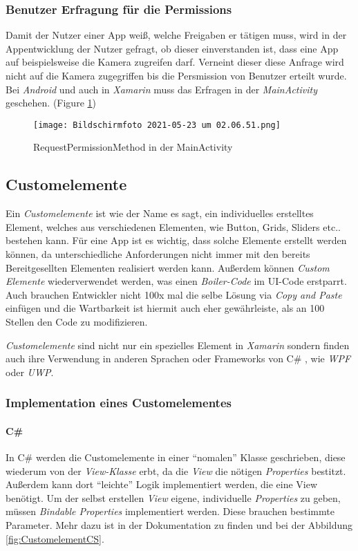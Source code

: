\subsubsection{Benutzer Erfragung für die Permissions}
Damit der Nutzer einer App weiß, welche Freigaben er tätigen muss, wird in der Appentwicklung der Nutzer gefragt,
ob dieser einverstanden ist, dass eine App auf beispielsweise die Kamera zugreifen darf. Verneint dieser diese Anfrage
wird nicht auf die Kamera zugegriffen bis die Persmission von Benutzer erteilt wurde.
Bei \textit{Android} und auch in \textit{Xamarin} muss das Erfragen in der \textit{MainActivity} geschehen. (Figure \ref{fig:MainActivity})

\begin{figure}[h]
    \centering
    \texttt{[image: Bildschirmfoto 2021-05-23 um 02.06.51.png]}
    \caption{RequestPermissionMethod in der MainActivity}
    \label{fig:MainActivity}
\end{figure}
\subsection{Customelemente}
Ein \textit{Customelemente} ist wie der Name es sagt, ein individuelles erstelltes Element, welches aus verschiedenen Elementen, wie Button, Grids, Sliders etc.. bestehen kann.
Für eine App ist es wichtig, dass solche Elemente erstellt werden können, da unterschiedliche Anforderungen nicht immer mit den bereits Bereitgesellten Elementen realisiert werden kann.
Außerdem können \textit{Custom Elemente} wiederverwendet werden, was einen \textit{Boiler-Code} im UI-Code erstparrt.
Auch brauchen Entwickler nicht 100x mal die selbe Lösung via \textit{Copy and Paste} einfügen und die Wartbarkeit ist hiermit auch eher gewährleiste, als an 100 Stellen den Code zu modifizieren.

\textit{Customelemente} sind nicht nur ein spezielles Element in \textit{Xamarin} sondern finden auch ihre Verwendung in anderen Sprachen oder 
Frameworks von C\# , wie \textit{WPF} oder \textit{UWP}. 

\subsubsection{Implementation eines Customelementes}
\paragraph{C\#} In C\# werden die Customelemente in einer ``nomalen'' Klasse geschrieben, diese wiederum von der \textit{View-Klasse} erbt, da die \textit{View} die nötigen \textit{Properties} bestitzt.
Außerdem  kann dort ``leichte'' Logik implementiert werden, die eine View benötigt. Um der selbst erstellen \textit{View} eigene, individuelle \textit{Properties}
zu geben, müssen \textit{Bindable Properties} implementiert werden. Diese brauchen bestimmte Parameter. Mehr dazu ist in der Dokumentation zu finden und
bei der Abbildung \ref{fig:CustomelementCS}.

